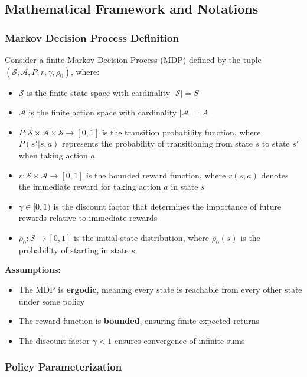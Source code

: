 \subsection{Mathematical Framework and Notations}

\subsubsection{Markov Decision Process Definition}

Consider a finite Markov Decision Process (MDP) defined by the tuple $(\mathcal{S}, \mathcal{A}, P, r, \gamma, \rho_0)$, where:
\begin{itemize}
    \item $\mathcal{S}$ is the finite state space with cardinality $|\mathcal{S}| = S$
    \item $\mathcal{A}$ is the finite action space with cardinality $|\mathcal{A}| = A$  
    \item $P: \mathcal{S} \times \mathcal{A} \times \mathcal{S} \rightarrow [0,1]$ is the transition probability function, where $P(s'|s, a)$ represents the probability of transitioning from state $s$ to state $s'$ when taking action $a$
    \item $r: \mathcal{S} \times \mathcal{A} \rightarrow [0, 1]$ is the bounded reward function, where $r(s, a)$ denotes the immediate reward for taking action $a$ in state $s$
    \item $\gamma \in [0, 1)$ is the discount factor that determines the importance of future rewards relative to immediate rewards
    \item $\rho_0: \mathcal{S} \rightarrow [0,1]$ is the initial state distribution, where $\rho_0(s)$ is the probability of starting in state $s$
\end{itemize}

\textbf{Assumptions:}
\begin{itemize}
    \item The MDP is \textbf{ergodic}, meaning every state is reachable from every other state under some policy
    \item The reward function is \textbf{bounded}, ensuring finite expected returns
    \item The discount factor $\gamma < 1$ ensures convergence of infinite sums
\end{itemize}

\subsubsection{Policy Parameterization}

